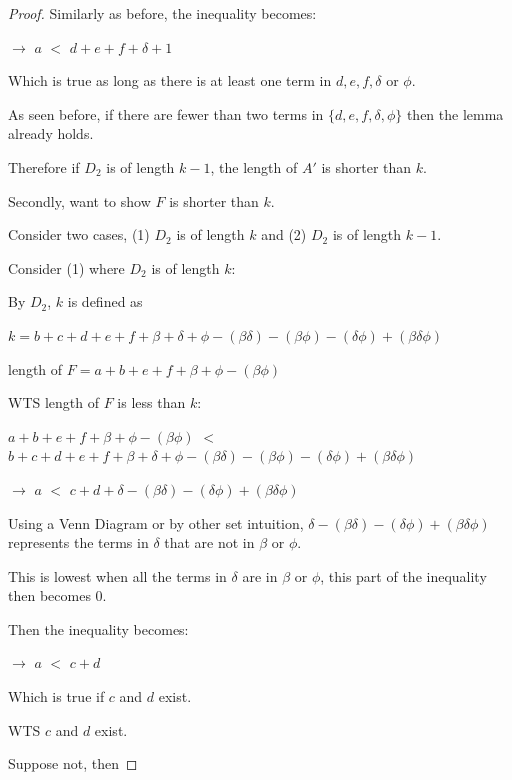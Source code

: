 \documentclass[manuscript]{acmart}
\begin{document}
\begin{proof}
        Similarly as before, the inequality becomes:

        $\rightarrow$ $a$ $<$ $d + e + f + \delta + 1$

        Which is true as long as there is at least one term in
        $d, e, f, \delta$ or $\phi$.

        As seen before, if there are fewer than two terms in
        $\{d, e, f, \delta, \phi\}$ then the lemma already holds.

        Therefore if $D_2$ is of length $k - 1$, the length of $A'$ is 
        shorter than $k$.
        
        Secondly, want to show $F$ is shorter than $k$.

        Consider two cases, (1) $D_2$ is of length $k$ and 
        (2) $D_2$ is of length $k - 1$.

        Consider (1) where $D_2$ is of length $k$:
        
        By $D_2$, $k$ is defined as 

        $k = b + c + d + e + f + \beta + \delta + \phi - (\beta \delta) 
        - (\beta \phi) - (\delta \phi) + (\beta \delta \phi)$

        length of $F = a + b + e + f + \beta + \phi - (\beta \phi)$
        
        WTS length of $F$ is less than $k$:

        $a + b + e + f + \beta + \phi - (\beta \phi)$ $<$ 
        $b + c + d + e + f + \beta + \delta + \phi - (\beta \delta) 
        - (\beta \phi) - (\delta \phi) + (\beta \delta \phi)$

        $\rightarrow$ $a$ $<$ $c + d + \delta - (\beta \delta) - 
        (\delta \phi) + (\beta \delta \phi)$

        Using a Venn Diagram or by other set intuition, 
        $\delta - (\beta \delta) - (\delta \phi) + (\beta \delta \phi)$
        represents the terms in $\delta$ that are not in $\beta$ or $\phi$.
        
        This is lowest when all the terms in $\delta$ are in $\beta$ or $\phi$, 
        this part of the inequality then becomes 0.

        Then the inequality becomes:

        $\rightarrow$ $a$ $<$ $c + d$

        Which is true if $c$ and $d$ exist.

        WTS $c$ and $d$ exist.

        Suppose not, then


\end{proof}
\end{document}
